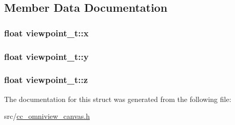 \subsection{Member Data Documentation}
\hypertarget{a00154_ac56bed9166a31f4fe308a50955ee674e}{
\subsubsection[{x}]{\setlength{\rightskip}{0pt plus 5cm}float viewpoint\-\_\-t\-::x}}\label{a00154_ac56bed9166a31f4fe308a50955ee674e}
\hypertarget{a00154_adbf440b0c73cac9460d9a3f34fa25598}{
\subsubsection[{y}]{\setlength{\rightskip}{0pt plus 5cm}float viewpoint\-\_\-t\-::y}}\label{a00154_adbf440b0c73cac9460d9a3f34fa25598}
\hypertarget{a00154_ac07303f8a0812664285fcb487528912c}{
\subsubsection[{z}]{\setlength{\rightskip}{0pt plus 5cm}float viewpoint\-\_\-t\-::z}}\label{a00154_ac07303f8a0812664285fcb487528912c}


The documentation for this struct was generated from the following file\-:\begin{DoxyCompactItemize}
\item 
src/\hyperlink{a00185}{cc\-\_\-omniview\-\_\-canvas.\-h}\end{DoxyCompactItemize}
